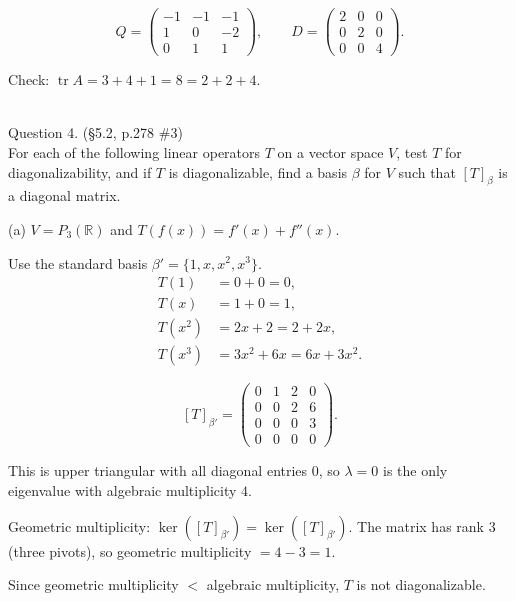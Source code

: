 \documentclass{article}
\begin{document}
\begin{mdframed}[linewidth=1pt]
\[
\boxed{Q = \begin{pmatrix} -1 & -1 & -1 \\ 1 & 0 & -2 \\ 0 & 1 & 1 \end{pmatrix}, \qquad D = \begin{pmatrix} 2 & 0 & 0 \\ 0 & 2 & 0 \\ 0 & 0 & 4 \end{pmatrix}.}
\]

\textnormal{Check:} $\operatorname{tr} A = 3 + 4 + 1 = 8 = 2 + 2 + 4$.\end{mdframed}

\bigskip

\newpage


\hfill \break  $~\!\!$ \dotfill \medskip \\
\textnormal{Question 4.} (\S5.2, p.278 \#3)\\
For each of the following linear operators $T$ on a vector space $V$, test $T$ for diagonalizability, and if $T$ is diagonalizable, find a basis $\beta$ for $V$ such that $[T]_\beta$ is a diagonal matrix.

\bigskip

\noindent\textnormal{(a)} $V = P_3(\mathbb{R})$ and $T(f(x)) = f'(x) + f''(x)$.

\begin{mdframed}[linewidth=1pt]
Use the standard basis $\beta' = \{1, x, x^2, x^3\}$.
\begin{align*}
T(1) &= 0 + 0 = 0, \\
T(x) &= 1 + 0 = 1, \\
T(x^2) &= 2x + 2 = 2 + 2x, \\
T(x^3) &= 3x^2 + 6x = 6x + 3x^2.
\end{align*}

\[
[T]_{\beta'} = \begin{pmatrix} 0 & 1 & 2 & 0 \\ 0 & 0 & 2 & 6 \\ 0 & 0 & 0 & 3 \\ 0 & 0 & 0 & 0 \end{pmatrix}.
\]

This is upper triangular with all diagonal entries $0$, so $\lambda = 0$ is the only eigenvalue with algebraic multiplicity $4$.

Geometric multiplicity: $\ker([T]_{\beta'}) = \ker([T]_{\beta'})$. The matrix has rank $3$ (three pivots), so geometric multiplicity $= 4 - 3 = 1$.

Since geometric multiplicity $< $ algebraic multiplicity, $T$ is \textnormal{not diagonalizable}.
\end{mdframed}
\end{document}
